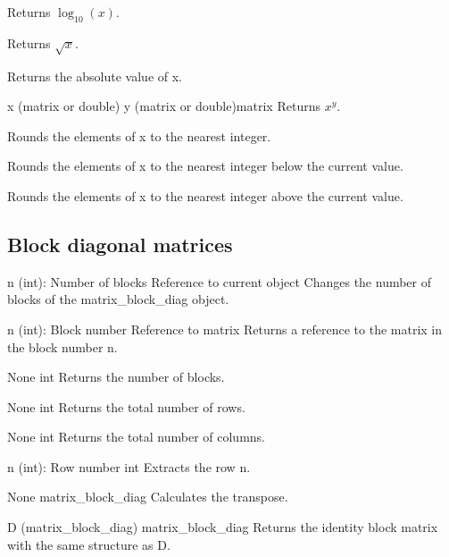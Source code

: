 {Returns $\log_{10}(x)$.}

{Returns $\sqrt{x}$.}

{Returns the absolute value of x.}

{x (matrix or double)\newline
y (matrix or double)}{matrix}
{Returns $x^y$.}

{Rounds the elements of x to the nearest integer.}

{Rounds the elements of x to the nearest integer below the current value.}

{Rounds the elements of x to the nearest integer above the current value.}

\subsection{Block diagonal matrices}

{n (int): Number of blocks}
{Reference to current object}
{Changes the number of blocks of the matrix\_block\_diag object.}

{n (int): Block number}
{Reference to matrix}
{Returns a reference to the matrix in the block number n.}

{None}
{int}
{Returns the number of blocks.}

{None}
{int}
{Returns the total number of rows.}

{None}
{int}
{Returns the total number of columns.}

{n (int): Row number}
{int}
{Extracts the row n.}

{None}
{matrix\_block\_diag}
{Calculates the transpose.}

{D (matrix\_block\_diag)}
{matrix\_block\_diag}
{Returns the identity block matrix with the same structure as D.}


\funcrefend

